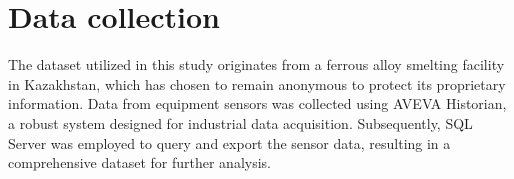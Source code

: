 \chapter{Data collection}
\label{chap:collection}
\setlength{\parskip}{1em}

The dataset utilized in this study originates from a ferrous alloy smelting facility in Kazakhstan, which has chosen to remain anonymous to protect its proprietary information. Data from equipment sensors was collected using AVEVA Historian, a robust system designed for industrial data acquisition. Subsequently, SQL Server was employed to query and export the sensor data, resulting in a comprehensive dataset for further analysis.